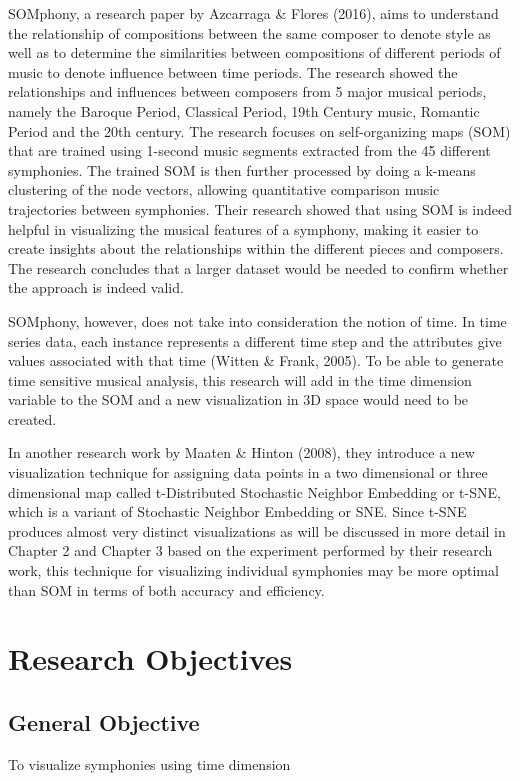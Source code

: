	SOMphony, a research paper by Azcarraga \& Flores (2016), aims to understand the relationship of compositions between the same composer to denote style as well as to determine the similarities between compositions of different periods of music to denote influence between time periods. The research showed the relationships and influences between composers from 5 major musical periods, namely the Baroque Period, Classical Period, 19th Century music, Romantic Period and the 20th century. The research focuses on self-organizing maps (SOM) that are trained using 1-second music segments extracted from the 45 different symphonies. The trained SOM is then further processed by doing a k-means clustering of the node vectors, allowing quantitative comparison music trajectories between symphonies. Their research showed that using SOM is indeed helpful in visualizing the musical features of a symphony, making it easier to create insights about the relationships within the different pieces and composers. The research concludes that a larger dataset would be needed to confirm whether the approach is indeed valid. 

	SOMphony, however, does not take into consideration the notion of time. In time series data, each instance represents a different time step and the attributes give values associated with that time (Witten  \& Frank, 2005).  To be able to generate time sensitive musical analysis, this research will add in the time dimension variable to the SOM and a new visualization in 3D space would need to be created.

	In another research work by Maaten \& Hinton (2008), they introduce a new visualization technique for assigning data points in a two dimensional or three dimensional map called  t-Distributed Stochastic Neighbor Embedding or t-SNE, which is a variant of Stochastic Neighbor Embedding or SNE. Since t-SNE produces almost very distinct visualizations as will be discussed in more detail in Chapter 2 and Chapter 3 based on the experiment performed by their research work, this technique for visualizing individual symphonies may be more optimal than SOM in terms of both accuracy and efficiency.


\section{Research Objectives}
\label{sec:researchobjectives}
\subsection{General Objective}
\label{sec:generalobjective}
To visualize symphonies using time dimension
